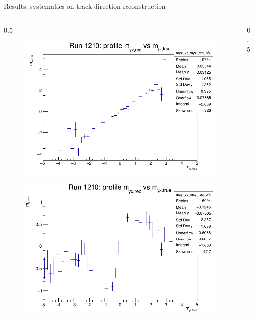 \documentclass{beamer}[10pt]
\begin{document}
\begin{frame}{Results: systematics on track direction reconstruction}
  \vspace{-3mm}
  \begin{columns}
    \begin{column}{0.5\framewidth}
      \begin{figure}[H]
        \centering
        \includegraphics[width= \textwidth]{figures/pdf/myz_vs_myz_rec_prof.png}
        \label{fig:enter-label}
    \end{figure}
     
    \vspace{-12mm}
    \begin{figure}[H]
      \centering
      \includegraphics[width= \textwidth]{figures/pdf/myx_vs_myx_rec_prof.png}
      \label{fig:enter-label}
  \end{figure}
    \end{column}
    \begin{column}{0.5\framewidth}
      \vspace{-4mm}


\end{column}
\end{columns}
\end{frame}
\end{document}
